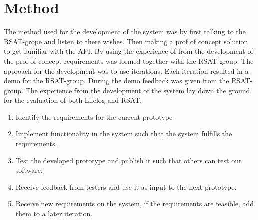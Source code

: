 \documentclass{cslthse-msc}
\begin{document}
\section{Method}%

The method used for the development of the system was by first talking to the RSAT-grope and listen to there wishes. Then making a prof of concept solution to get familiar with the API. By using the experience of from the development of the prof of concept requirements was formed together with the RSAT-group. The approach for the development was to use iterations. Each iteration resulted in a demo for the RSAT-group. During the demo feedback was given from the RSAT-group. The experience from the development of the system lay down the ground for the evaluation of both Lifelog and RSAT.









\begin{enumerate}
\item Identify the requirements for the current prototype
\item Implement functionality in the system such that the system fulfills the requirements.
\item Test the developed prototype and publish it such that others can test our software.
\item Receive feedback from testers and use it as input to the next prototype. 
\item Receive new requirements on the system, if the requirements are feasible, add them to a later iteration. 
\end{enumerate}
\end{document}
